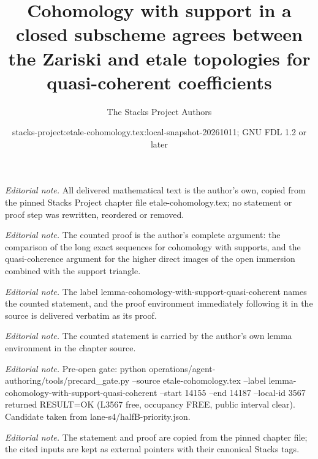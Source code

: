 \documentclass[10pt,a4paper]{amsart}
\title{Cohomology with support in a closed subscheme agrees between the Zariski and etale topologies for quasi-coherent coefficients}
\author{The Stacks Project Authors}
\date{stacks-project:etale-cohomology.tex:local-snapshot-20261011; GNU FDL 1.2 or later}
\theoremstyle{plain}
\theoremstyle{definition}
\theoremstyle{remark}
\numberwithin{equation}{subsection}
\begin{document}
\maketitle
\noindent\textit{Editorial note.} All delivered mathematical text is the author's own, copied from the pinned Stacks Project chapter file etale-cohomology.tex; no statement or proof step was rewritten, reordered or removed.\par\medskip
\noindent\textit{Editorial note.} The counted proof is the author's complete argument: the comparison of the long exact sequences for cohomology with supports, and the quasi-coherence argument for the higher direct images of the open immersion combined with the support triangle.\par\medskip
\noindent\textit{Editorial note.} The label lemma-cohomology-with-support-quasi-coherent names the counted statement, and the proof environment immediately following it in the source is delivered verbatim as its proof.\par\medskip
\noindent\textit{Editorial note.} The counted statement is carried by the author's own lemma environment in the chapter source.\par\medskip
\noindent\textit{Editorial note.} Pre-open gate: python operations/agent-authoring/tools/precard\_gate.py --source etale-cohomology.tex --label lemma-cohomology-with-support-quasi-coherent --start 14155 --end 14187 --local-id 3567 returned RESULT=OK (L3567 free, occupancy FREE, public interval clear). Candidate taken from lane-s4/halfB-priority.json.\par\medskip
\noindent\textit{Editorial note.} The statement and proof are copied from the pinned chapter file; the cited inputs are kept as external pointers with their canonical Stacks tags.\par\medskip
\end{document}
